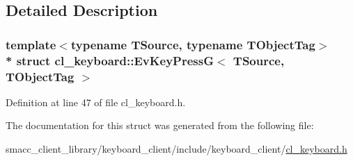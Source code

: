 \subsection{Detailed Description}
\subsubsection*{template$<$typename T\+Source, typename T\+Object\+Tag$>$\\*
struct cl\+\_\+keyboard\+::\+Ev\+Key\+Press\+G$<$ T\+Source, T\+Object\+Tag $>$}



Definition at line 47 of file cl\+\_\+keyboard.\+h.



The documentation for this struct was generated from the following file\+:\begin{DoxyCompactItemize}
\item 
smacc\+\_\+client\+\_\+library/keyboard\+\_\+client/include/keyboard\+\_\+client/\hyperlink{cl__keyboard_8h}{cl\+\_\+keyboard.\+h}\end{DoxyCompactItemize}

